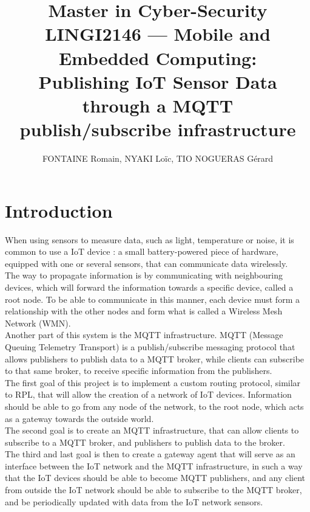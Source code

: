 \documentclass[a4paper,11pt]{article}
\title{Master in Cyber-Security\\
	LINGI2146 --- Mobile and Embedded Computing: \\
	Publishing IoT Sensor Data through a MQTT publish/subscribe infrastructure}
\author{FONTAINE Romain, NYAKI Loïc, TIO NOGUERAS Gérard}
\begin{document}
\maketitle
\newpage
\tableofcontents

\newpage

\section{Introduction}
When using sensors to measure data, such as light, temperature or noise, it is common to use a IoT device : a small battery-powered piece of hardware, equipped with one or several sensors, that can communicate data wirelessly.\\

The way to propagate information is by communicating with neighbouring devices, which will forward the information towards a specific device, called a root node. To be able to communicate in this manner, each device must form a relationship with the other nodes and form what is called a Wireless Mesh Network (WMN).\\

Another part of this system is the MQTT infrastructure. MQTT (Message Queuing Telemetry Transport) is a publish/subscribe messaging protocol that allows publishers to publish data to a MQTT broker, while clients can subscribe to that same broker, to receive specific information from the publishers.\\

The first goal of this project is to implement a custom routing protocol, similar to RPL,  that will allow the creation of a network of IoT devices. Information should be able to go from any node of the network, to the root node, which acts as a gateway towards the outside world. \\

The second goal is to create an MQTT infrastructure, that can allow clients to subscribe to a MQTT broker, and publishers to publish data to the broker.\\

The third and last goal is then to create a gateway agent that will serve as an interface between the IoT network and the MQTT infrastructure, in such a way that the IoT devices should be able to become MQTT publishers, and any client from outside the IoT network should be able to subscribe to the MQTT broker, and be periodically updated with data from the IoT network sensors.

\end{document}
